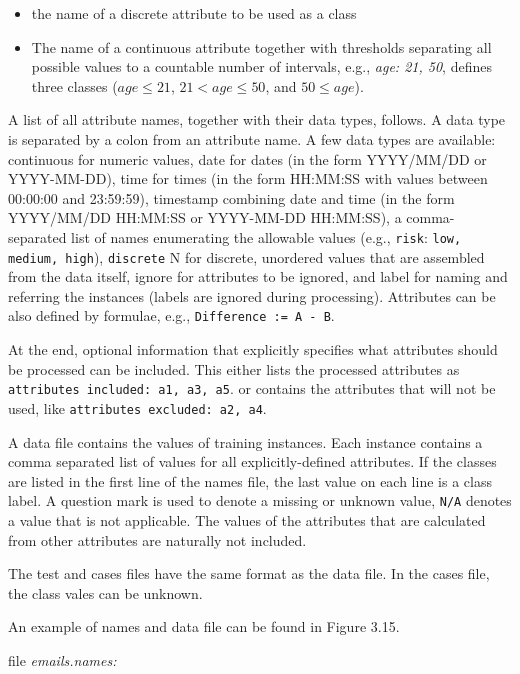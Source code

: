 \begin{itemize}
    \item the name of a discrete attribute to be used as a class
    \item The name of a continuous attribute together with thresholds separating all
possible values to a countable number of intervals, e.g., \textit{age: 21, 50},
defines three classes ($age \leq 21$, $21 < age \leq 50$, and $50 \leq age$).
\end{itemize}

A list of all attribute names, together with their data types, follows.
A data type is separated by a colon from an attribute name. A few data
types are available: continuous for numeric values, date for dates (in
the form YYYY/MM/DD or YYYY-MM-DD), time for times (in the form
HH:MM:SS with values between 00:00:00 and 23:59:59), timestamp combining date and time (in the form YYYY/MM/DD HH:MM:SS or YYYY-MM-DD
HH:MM:SS), a comma-separated list of names enumerating the allowable values (e.g., \texttt{risk}: \texttt{low, medium, high}), \texttt{discrete} N for discrete, unordered
values that are assembled from the data itself, ignore for attributes to be ignored, and label for naming and referring the instances (labels are ignored
during processing). Attributes can be also defined by formulae, e.g., \texttt{Difference
:= A - B}.

At the end, optional information that explicitly specifies what attributes
should be processed can be included. This either lists the processed attributes
as \texttt{attributes included: a1, a3, a5}. or contains the attributes that will
not be used, like \texttt{attributes excluded: a2, a4}.

A data file contains the values of training instances. Each instance contains a
comma separated list of values for all explicitly-defined attributes. If the classes
are listed in the first line of the names file, the last value on each line is a class label. A question mark is used to denote a missing or unknown value, \texttt{N/A} denotes
a value that is not applicable. The values of the attributes that are calculated from
other attributes are naturally not included.

The test and cases files have the same format as the data file. In the cases
file, the class vales can be unknown.

An example of names and data file can be found in Figure 3.15.

\begin{center}
    file \textit{emails.names:}
\end{center}

